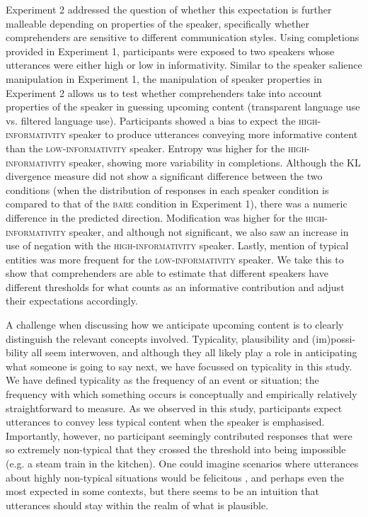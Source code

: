 \documentclass[output=paper,colorlinks,citecolor=brown]{langscibook}
\begin{document}
Experiment 2 addressed the question of whether this expectation is further malleable depending on properties of the speaker, specifically whether comprehenders are sensitive to different communication styles. Using completions provided in Experiment 1, participants were exposed to two speakers whose utterances were either high or low in informativity. Similar to the speaker salience manipulation in Experiment 1, the manipulation of speaker properties in Experiment 2 allows us to test whether comprehenders take into account properties of the speaker in guessing upcoming content (transparent language use vs. filtered language use). Participants showed a bias to expect the \textsc{high-informativity} speaker to produce utterances conveying more informative content than the \textsc{low-informativity} speaker. Entropy was higher for the \textsc{high-informativity} speaker, showing more variability in completions. Although the KL divergence measure did not show a significant difference between the two conditions (when the distribution of responses in each speaker condition is compared to that of the {\textsc{bare}} condition in Experiment 1), there was a numeric difference in the predicted direction. Modification was higher for the \textsc{high-informativity} speaker, and although not significant, we also saw an increase in use of negation with the \textsc{high-informativity} speaker. Lastly, mention of typical entities was more frequent for the \textsc{low-informativity} speaker. We take this to show that comprehenders are able to estimate that different speakers have different thresholds for what counts as an informative contribution and adjust their expectations accordingly.

A challenge when discussing how we anticipate upcoming content is to clearly distinguish the relevant concepts involved. Typicality, plausibility and (im)possi-bility all seem interwoven, and although they all likely play a role in anticipating what someone is going to say next, we have focussed on typicality in this study. We have defined typicality as the frequency of an event or situation; the frequency with which something occurs is conceptually and empirically relatively straightforward to measure. As we observed in this study, participants expect utterances to convey less typical content when the speaker is emphasised. Importantly, however, no participant seemingly contributed responses that were so extremely non-typical that they crossed the threshold into being impossible (e.g. a steam train in the kitchen). One could imagine scenarios where utterances about highly non-typical situations would be felicitous \citep[e.g. in descriptions of fictional or dream worlds;][]{FoyGerrig2014, TroyerKutas2020}, and perhaps even the most expected in some contexts, but there seems to be an intuition that utterances should stay within the realm of what is plausible. 
\end{document}
